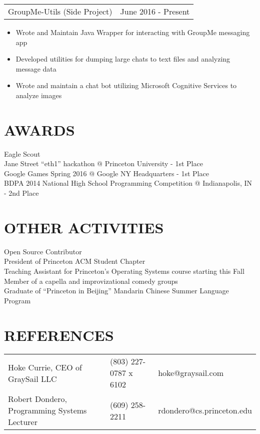 \documentclass[margin]{res}
\begin{document}
\begin{resume}
    \begin{tabular}{p{3.5in} p{3in}}
        GroupMe-Utils (Side Project) & June 2016 - Present
    \end{tabular}
    \begin{itemize} \itemsep -2pt
        \item Wrote and Maintain Java Wrapper for interacting with GroupMe messaging app
        \item Developed utilities for dumping large chats to text files and analyzing message data
        \item Wrote and maintain a chat bot utilizing Microsoft Cognitive Services to analyze images
    \end{itemize}
\section{AWARDS}
            Eagle Scout \\
            Jane Street ``eth1'' hackathon @ Princeton University - 1st Place \\
            Google Games Spring 2016 @ Google NY Headquarters - 1st Place \\
            BDPA 2014 National High School Programming Competition @ Indianapolis, IN - 2nd Place

\section{OTHER ACTIVITIES}
            Open Source Contributor \\
            President of Princeton ACM Student Chapter\\
            Teaching Assistant for Princeton's Operating Systems course starting this Fall\\
            Member of a capella and improvizational comedy groups\\
            Graduate of ``Princeton in Beijing'' Mandarin Chinese Summer Language Program

\section{REFERENCES}
    \hspace*{-.40in}
    \begin{tabular}{p{2.75in} p{1.25in} p{2in}}
            Hoke Currie, CEO of GraySail LLC & (803) 227-0787 x 6102 & hoke@graysail.com \\
            Robert Dondero, Programming Systems Lecturer & (609) 258-2211 & rdondero@cs.princeton.edu
    \end{tabular}
 

 
\end{resume} 
\end{document}
